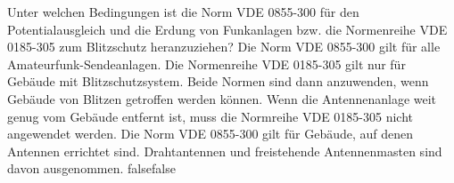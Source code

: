     {Unter welchen Bedingungen ist die Norm VDE 0855-300 für den Potentialausgleich und die Erdung von Funkanlagen bzw. die Normenreihe VDE 0185-305 zum Blitzschutz heranzuziehen?}
    {Die Norm VDE 0855-300 gilt für alle Amateurfunk-Sendeanlagen. Die Normenreihe VDE 0185-305 gilt nur für Gebäude mit Blitzschutzsystem.}
    {Beide Normen sind dann anzuwenden, wenn Gebäude von Blitzen getroffen werden können.}
    {Wenn die Antennenanlage weit genug vom Gebäude entfernt ist, muss die Normreihe VDE 0185-305 nicht angewendet werden.}
    {Die Norm VDE 0855-300 gilt für Gebäude, auf denen Antennen errichtet sind. Drahtantennen und freistehende Antennenmasten sind davon ausgenommen.}
    {false}{false}